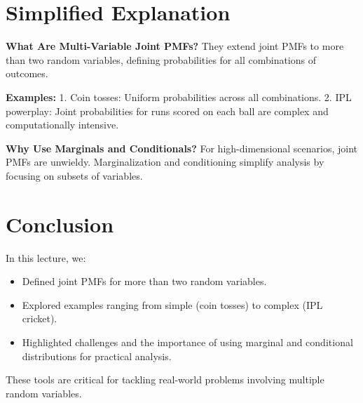 \documentclass{article}
\begin{document}
\section*{Simplified Explanation}

\textbf{What Are Multi-Variable Joint PMFs?}
They extend joint PMFs to more than two random variables, defining probabilities for all combinations of outcomes.

\textbf{Examples:}
1. Coin tosses: Uniform probabilities across all combinations.
2. IPL powerplay: Joint probabilities for runs scored on each ball are complex and computationally intensive.

\textbf{Why Use Marginals and Conditionals?}
For high-dimensional scenarios, joint PMFs are unwieldy. Marginalization and conditioning simplify analysis by focusing on subsets of variables.

\section*{Conclusion}

In this lecture, we:
\begin{itemize}
  \item Defined joint PMFs for more than two random variables.
  \item Explored examples ranging from simple (coin tosses) to complex (IPL cricket).
  \item Highlighted challenges and the importance of using marginal and conditional distributions for practical analysis.
\end{itemize}

These tools are critical for tackling real-world problems involving multiple random variables.
\end{document}
